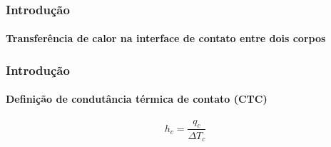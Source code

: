 \documentclass{beamer}
\begin{document}
\begin{frame}
	\frametitle{Introdução}
	\framesubtitle{Transferência de calor na interface de contato entre dois corpos}
	\begin{figure}[h!b]
		\begin{center}
		\end{center}
	\end{figure}
\end{frame}

\begin{frame}
	\frametitle{Introdução}
	\framesubtitle{Definição de condutância térmica de contato (CTC)}
	\begin{equation}
	h_c = \frac{q_c}{\Delta T_c}
	\end{equation}
\end{frame}
\end{document}
